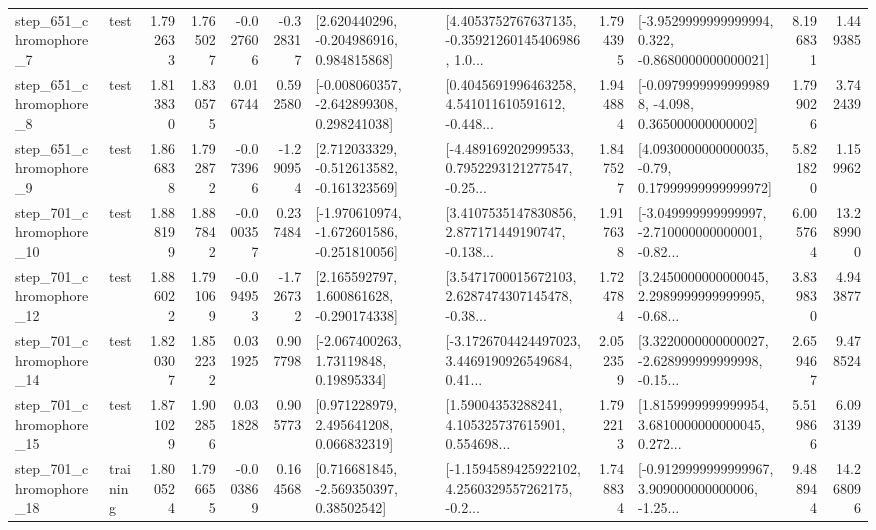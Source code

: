\begin{tabular}{llrrrrllrlrr}
   step\_651\_chromophore\_7 &      test &      1.792633 &    1.765027 &     -0.027606 & -0.328317 &    [2.620440296, -0.204986916, 0.984815868] &  [4.4053752767637135, -0.35921260145406986, 1.0... &       1.794395 &  [-3.9529999999999994, 0.322, -0.8680000000000021] &            8.196831 &          1.449385 \\
   step\_651\_chromophore\_8 &      test &      1.813830 &    1.830575 &      0.016744 &  0.592580 &   [-0.008060357, -2.642899308, 0.298241038] &  [0.4045691996463258, 4.541011610591612, -0.448... &       1.944884 &  [-0.09799999999999898, -4.098, 0.365000000000002] &            1.799026 &          3.742439 \\
   step\_651\_chromophore\_9 &      test &      1.866838 &    1.792872 &     -0.073966 & -1.290954 &   [2.712033329, -0.512613582, -0.161323569] &  [-4.489169202999533, 0.7952293121277547, -0.25... &       1.847527 &   [4.0930000000000035, -0.79, 0.17999999999999972] &            5.821820 &          1.159962 \\
  step\_701\_chromophore\_10 &      test &      1.888199 &    1.887842 &     -0.000357 &  0.237484 &  [-1.970610974, -1.672601586, -0.251810056] &  [3.4107535147830856, 2.877171449190747, -0.138... &       1.917638 &  [-3.049999999999997, -2.710000000000001, -0.82... &            6.005764 &         13.289900 \\
  step\_701\_chromophore\_12 &      test &      1.886022 &    1.791069 &     -0.094953 & -1.726732 &    [2.165592797, 1.600861628, -0.290174338] &  [3.5471700015672103, 2.6287474307145478, -0.38... &       1.724784 &  [3.2450000000000045, 2.2989999999999995, -0.68... &            3.839830 &          4.943877 \\
  step\_701\_chromophore\_14 &      test &      1.820307 &    1.852232 &      0.031925 &  0.907798 &      [-2.067400263, 1.73119848, 0.19895334] &  [-3.1726704424497023, 3.4469190926549684, 0.41... &       2.052359 &  [3.3220000000000027, -2.628999999999998, -0.15... &            2.659467 &          9.478524 \\
  step\_701\_chromophore\_15 &      test &      1.871029 &    1.902856 &      0.031828 &  0.905773 &     [0.971228979, 2.495641208, 0.066832319] &  [1.59004353288241, 4.105325737615901, 0.554698... &       1.792213 &  [1.8159999999999954, 3.6810000000000045, 0.272... &            5.519866 &          6.093139 \\
  step\_701\_chromophore\_18 &  training &      1.800524 &    1.796655 &     -0.003869 &  0.164568 &     [0.716681845, -2.569350397, 0.38502542] &  [-1.1594589425922102, 4.2560329557262175, -0.2... &       1.748834 &  [-0.9129999999999967, 3.909000000000006, -1.25... &            9.488944 &         14.268096 \\

\end{tabular}
